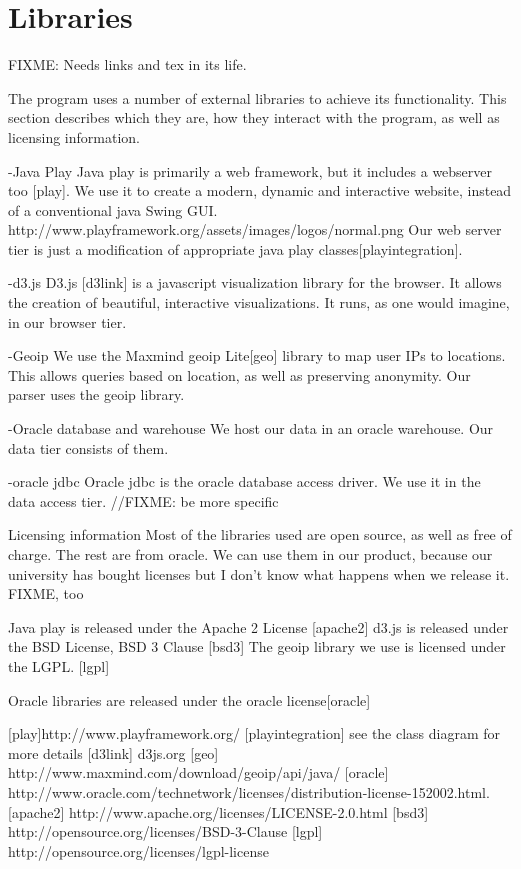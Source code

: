 \section{Libraries}
FIXME: Needs links and tex in its life.

The program uses a number of external libraries to achieve its functionality. This section describes which they are,
how they interact with the program, as well as licensing information. 

-Java Play
Java play is primarily a web framework, but it includes a webserver too [play].
We use it to create a modern, dynamic and interactive website, instead of a conventional java Swing GUI.
http://www.playframework.org/assets/images/logos/normal.png
Our web server tier is just a modification of appropriate java play classes[playintegration].

-d3.js
D3.js [d3link] is a javascript visualization library for the browser.
It allows the creation of beautiful, interactive visualizations.
It runs, as one would imagine, in our browser tier.

-Geoip
We use the Maxmind geoip Lite[geo] library to map user IPs to locations.
This allows queries based on location, as well as preserving anonymity.
Our parser uses the geoip library.

-Oracle database and warehouse
We host our data in an oracle warehouse.
Our data tier consists of them. %

-oracle jdbc
Oracle jdbc is the oracle database access driver. We use it in the data access tier. //FIXME: be more specific



Licensing information
Most of the libraries used are open source, as well as free of charge.
The rest are from oracle. We can use them in our product, because our university has bought licenses but I don't know what happens when we release it. FIXME, too

Java play is released under the Apache 2 License [apache2]
d3.js is released under the BSD License, BSD 3 Clause [bsd3]
The geoip library we use is licensed under the LGPL. [lgpl]

Oracle libraries are released under the oracle license[oracle]



[play]http://www.playframework.org/
[playintegration] see the class diagram for more details
[d3link] d3js.org
[geo] http://www.maxmind.com/download/geoip/api/java/
[oracle] http://www.oracle.com/technetwork/licenses/distribution-license-152002.html.
[apache2] http://www.apache.org/licenses/LICENSE-2.0.html
[bsd3]  http://opensource.org/licenses/BSD-3-Clause
[lgpl] http://opensource.org/licenses/lgpl-license
